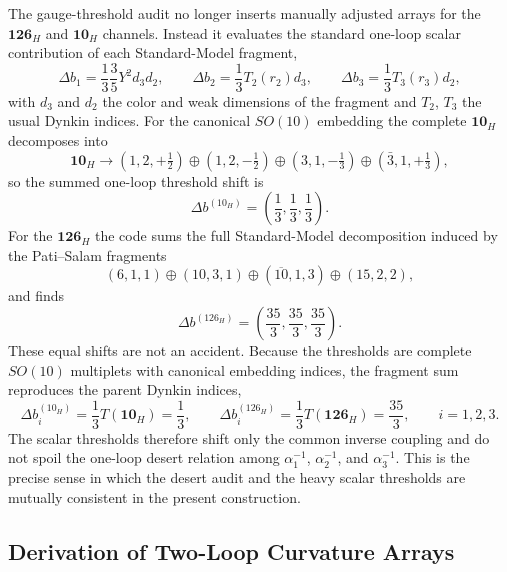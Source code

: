 \documentclass[11pt]{article}
\begin{document}
The gauge-threshold audit no longer inserts manually adjusted arrays for the $\mathbf{126}_H$ and $\mathbf{10}_H$ channels. Instead it evaluates the standard one-loop scalar contribution of each Standard-Model fragment,
\begin{equation}
 \Delta b_1=\frac13\frac35Y^2d_3d_2,
 \qquad
 \Delta b_2=\frac13T_2(r_2)d_3,
 \qquad
 \Delta b_3=\frac13T_3(r_3)d_2,
\end{equation}
with $d_3$ and $d_2$ the color and weak dimensions of the fragment and $T_2$, $T_3$ the usual Dynkin indices. For the canonical $SO(10)$ embedding the complete $\mathbf{10}_H$ decomposes into
\begin{equation}
 \mathbf{10}_H
 \to
 (1,2,+\tfrac12)\oplus(1,2,-\tfrac12)
 \oplus(3,1,-\tfrac13)\oplus(\bar3,1,+\tfrac13),
\end{equation}
so the summed one-loop threshold shift is
\begin{equation}
 \Delta b^{(10_H)}
 =
 \left(\frac13,\frac13,\frac13\right).
\end{equation}
For the $\mathbf{126}_H$ the code sums the full Standard-Model decomposition induced by the Pati--Salam fragments
\begin{equation}
 (6,1,1)\oplus(10,3,1)\oplus(\overline{10},1,3)\oplus(15,2,2),
\end{equation}
and finds
\begin{equation}
 \Delta b^{(126_H)}
 =
 \left(\frac{35}{3},\frac{35}{3},\frac{35}{3}\right).
\end{equation}
These equal shifts are not an accident. Because the thresholds are complete $SO(10)$ multiplets with canonical embedding indices, the fragment sum reproduces the parent Dynkin indices,
\begin{equation}
 \Delta b^{(10_H)}_i=\frac13T(\mathbf{10}_H)=\frac13,
 \qquad
 \Delta b^{(126_H)}_i=\frac13T(\mathbf{126}_H)=\frac{35}{3},
 \qquad i=1,2,3.
\end{equation}
The scalar thresholds therefore shift only the common inverse coupling and do not spoil the one-loop desert relation among $\alpha_1^{-1}$, $\alpha_2^{-1}$, and $\alpha_3^{-1}$. This is the precise sense in which the desert audit and the heavy scalar thresholds are mutually consistent in the present construction.

\subsection{Derivation of Two-Loop Curvature Arrays}
\end{document}
